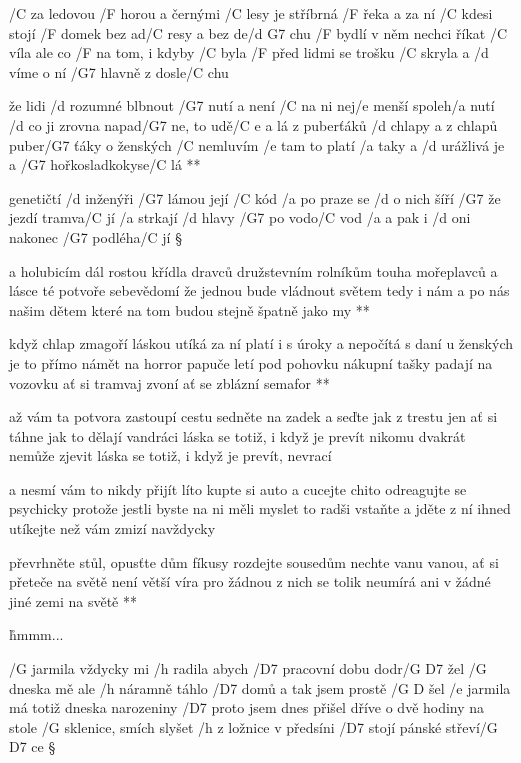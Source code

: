 
/C za ledovou /F horou a černými /C lesy
je stříbrná /F řeka a za ní /C kdesi
stojí /F domek bez ad/C resy a bez de/{d G7} chu
/F bydlí v něm nechci říkat /C víla
ale co /F na tom, i kdyby /C byla
/F před lidmi se trošku /C skryla
a /d víme o ní /G7 hlavně z dosle/C chu

\R  že lidi /d rozumné blbnout /G7 nutí
    a není /C na ni nej/e menší spoleh/a nutí
    /d co ji zrovna napad/G7 ne, to udě/{C e a} lá
    z puberťáků /d chlapy a z chlapů puber/G7 ťáky
    o ženských /C nemluvím /e tam to platí /a taky
    a /d urážlivá je a /G7 hořkosladkokyse/C lá **

genetičtí /d inženýři /G7 lámou její /C kód
/a po praze se /d o nich šíří /G7 že jezdí tramva/C jí
/a strkají /d hlavy /G7 po vodo/C vod
/a a pak i /d oni nakonec /G7 podléha/C jí \S

\R  a holubicím dál rostou křídla dravců
    družstevním rolníkům touha mořeplavců
    a lásce té potvoře sebevědomí
    že jednou bude vládnout světem
    tedy i nám a po nás našim dětem
    které na tom budou stejně špatně jako my ** 
\songgg{}

\R  když chlap zmagoří láskou utíká za ní
    platí i s úroky a nepočítá s daní
    u ženských je to přímo námět na horror
    papuče letí pod pohovku
    nákupní tašky padají na vozovku
    ať si tramvaj zvoní ať se zblázní semafor **

až vám ta potvora zastoupí cestu
sedněte na zadek a seďte jak z trestu
jen ať si táhne jak to dělají vandráci
láska se totiž, i když je prevít
nikomu dvakrát nemůže zjevit
láska se totiž, i když je prevít, nevrací \s

a nesmí vám to nikdy přijít líto
kupte si auto a cucejte chito
odreagujte se psychicky
protože jestli byste na ni měli myslet
to radši vstaňte a jděte z ní ihned
utíkejte než vám zmizí navždycky

\R  převrhněte stůl, opusťte dům
    fíkusy rozdejte sousedům
    nechte vanu vanou, ať si přeteče
    na světě není větší víra
    pro žádnou z nich se tolik neumírá
    ani v žádné jiné zemi na světě **

\r  hmmm...




/G jarmila vždycky mi /h radila
abych /D7 pracovní dobu dodr/{G D7} žel
/G dneska mě ale /h náramně táhlo /D7 domů
a tak jsem prostě /{G D} šel
/e jarmila má totiž dneska narozeniny
/D7 proto jsem dnes přišel dříve o dvě hodiny
na stole /G sklenice, smích slyšet /h z ložnice
v předsíni /D7 stojí pánské střeví/{G D7} ce \S

